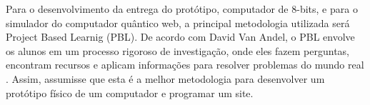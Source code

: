 Para o desenvolvimento da entrega do protótipo, computador de 8-bits, e para o simulador do computador quântico web, a principal metodologia utilizada será Project Based Learnig (PBL). De acordo com  David Van Andel, o PBL envolve os alunos em um processo rigoroso de investigação, onde eles fazem perguntas, encontram recursos e aplicam informações para resolver problemas do mundo real \cite{3}. Assim, assumisse que esta é a melhor metodologia para desenvolver um protótipo físico de um computador e programar um site.

\newpage